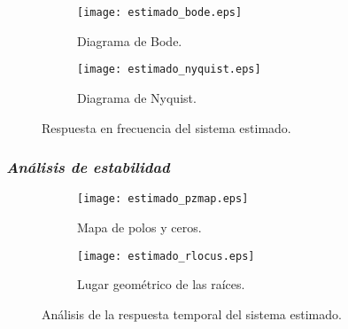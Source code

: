 \begin{figure}[H]
    \centering

    \begin{subfigure}[b]{0.49\textwidth}
        \centering
        \texttt{[image: estimado\_bode.eps]}
        \caption{Diagrama de Bode.}
        \label{fig:estimado_bode}
    \end{subfigure}
    \begin{subfigure}[b]{0.49\textwidth}
        \centering
        \texttt{[image: estimado\_nyquist.eps]}
        \caption{Diagrama de Nyquist.}
        \label{fig:estimado_nyquist}
    \end{subfigure}

    \vspace{-0.25cm}
    \caption{Respuesta en frecuencia del sistema estimado.}
    \label{fig:estimado_frecuencia}
\end{figure}
\vspace{-0.5cm}

\subsubsection*{\it{Análisis de estabilidad}}
\vspace{-0.5cm}

\begin{figure}[H]
    \centering

    \begin{subfigure}[b]{0.49\textwidth}
        \centering
        \texttt{[image: estimado\_pzmap.eps]}
        \caption{Mapa de polos y ceros.}
        \label{fig:estimado_pzmap}
    \end{subfigure}
    \begin{subfigure}[b]{0.49\textwidth}
        \centering
        \texttt{[image: estimado\_rlocus.eps]}
        \caption{Lugar geométrico de las raíces.}
        \label{fig:estimado_rlocus}
    \end{subfigure}

    \vspace{-0.25cm}
    \caption{Análisis de la respuesta temporal del sistema estimado.}
    \label{fig:estimado_estabilidad}
\end{figure}
\vspace{-0.5cm}

